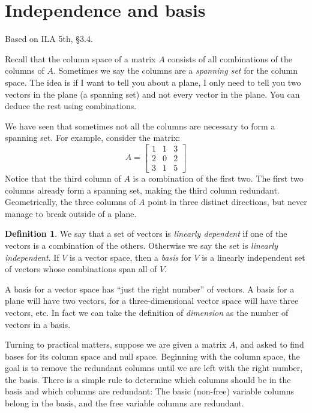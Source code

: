 \documentclass[11pt,oneside]{amsbook}
\theoremstyle{definition}
\theoremstyle{plain}
\theoremstyle{definition}
\newtheorem{definition}[theorem]{Definition}
\theoremstyle{remark}
\numberwithin{equation}{section}
\numberwithin{figure}{section}
\begin{document}
\section{Independence and basis}

Based on ILA 5th, \S 3.4.

Recall that the column space of a matrix $A$ consists of all combinations of the columns of $A$. Sometimes we say the columns are a \emph{spanning set} for the column space. The idea is if I want to tell you about a plane, I only need to tell you two vectors in the plane (a spanning set) and not every vector in the plane. You can deduce the rest using combinations.

We have seen that sometimes not all the columns are necessary to form a spanning set. For example, consider the matrix:
\[A=\begin{bmatrix}1&1&3\\2&0&2\\3&1&5\end{bmatrix}
\]
Notice that the third column of $A$ is a combination of the first two. The first two columns already form a spanning set, making the third column redundant. Geometrically, the three columns of $A$ point in three distinct directions, but never manage to break outside of a plane.

\begin{definition}
  We say that a set of vectors is \emph{linearly dependent} if one of the vectors is a combination of the others. Otherwise we say the set is \emph{linearly independent}. If $V$ is a vector space, then a \emph{basis} for $V$ is a linearly independent set of vectors whose combinations span all of $V$.
\end{definition}

A basis for a vector space has ``just the right number'' of vectors. A basis for a plane will have two vectors, for a three-dimensional vector space will have three vectors, etc. In fact we can take the definition of \emph{dimension} as the number of vectors in a basis.

Turning to practical matters, suppose we are given a matrix $A$, and asked to find bases for its column space and null space. Beginning with the column space, the goal is to remove the redundant columns until we are left with the right number, the basis. There is a simple rule to determine which columns should be in the basis and which columns are redundant: The basic (non-free) variable columns belong in the basis, and the free variable columns are redundant.
\end{document}
